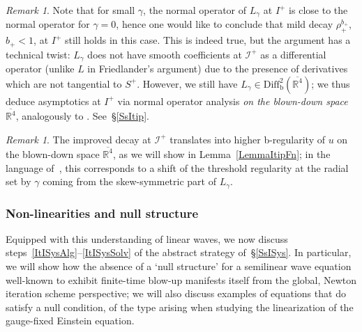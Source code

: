 \documentclass[reqno,11pt,letterpaper]{amsart}
\numberwithin{equation}{section}
\numberwithin{figure}{section}
\theoremstyle{definition}
\theoremstyle{remark}
\newtheorem{rmk}[thm]{Remark}
\newcommand{\ms}{\mathscr}
\newcommand{\scri}{\ms I}
\newcommand{\R}{\mathbb{R}}
\newcommand{\ol}{\overline}
\newcommand{\bop}{{\mathrm{b}}}
\newcommand{\Diff}{\mathrm{Diff}}
\newcommand{\Diffb}{\Diff_\bop}
\begin{document}
\begin{rmk}
\label{RmkISysLinResonances}
  Note that for small $\gamma$, the normal operator of $L_\gamma$ at $I^+$ is close to the normal operator for $\gamma=0$, hence one would like to conclude that mild decay $\rho_+^{b_+}$, $b_+<1$, at $I^+$ still holds in this case. This is indeed true, but the argument has a technical twist: $L_\gamma$ does not have smooth coefficients at $\scri^+$ as a differential operator (unlike $L$ in Friedlander's argument) due to the presence of derivatives which are not tangential to $S^+$. However, we still have $L_\gamma\in\Diffb^2(\ol{\R^4})$; we thus deduce asymptotics at $I^+$ via normal operator analysis \emph{on the blown-down space} $\ol{\R^4}$, analogously to \cite{BaskinVasyWunschRadMink,BaskinVasyWunschRadMink2}. See~\S\ref{SsItip}.
\end{rmk}

\begin{rmk}
\label{RmkISysLinRadial}
  The improved decay at $\scri^+$ translates into higher b-regularity of $u$ on the blown-down space $\ol{\R^4}$, as we will show in Lemma~\ref{LemmaItipFn}; in the language of~\cite[Proposition~4.4]{BaskinVasyWunschRadMink}, this corresponds to a shift of the threshold regularity at the radial set by $\gamma$ coming from the skew-symmetric part of $L_\gamma$.
\end{rmk}



\subsubsection{Non-linearities and null structure}
\label{SssISysNull}

Equipped with this understanding of linear waves, we now discuss steps~\ref{ItISysAlg}--\ref{ItISysSolv} of the abstract strategy of~\S\ref{SsISys}. In particular, we will show how the absence of a `null structure' for a semilinear wave equation well-known to exhibit finite-time blow-up manifests itself from the global, Newton iteration scheme perspective; we will also discuss examples of equations that do satisfy a null condition, of the type arising when studying the linearization of the gauge-fixed Einstein equation.
\end{document}
